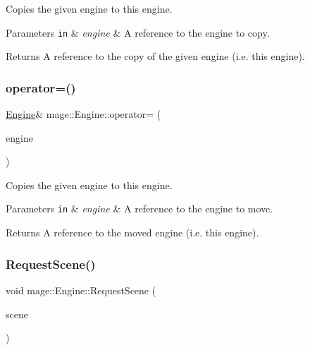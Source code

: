 Copies the given engine to this engine.


\begin{DoxyParams}[1]{Parameters}
\mbox{\tt in}  & {\em engine} & A reference to the engine to copy. \\
\hline
\end{DoxyParams}
\begin{DoxyReturn}{Returns}
A reference to the copy of the given engine (i.\+e. this engine). 
\end{DoxyReturn}
\hypertarget{classmage_1_1_engine_a22607a263e0be5e179cc0e4bf13b18f7}{}\label{classmage_1_1_engine_a22607a263e0be5e179cc0e4bf13b18f7} 
\subsubsection{\texorpdfstring{operator=()}{operator=()}\hspace{0.1cm}{\footnotesize\ttfamily [2/2]}}
{\footnotesize\ttfamily \hyperlink{classmage_1_1_engine}{Engine}\& mage\+::\+Engine\+::operator= (\begin{DoxyParamCaption}\item[{\hyperlink{classmage_1_1_engine}{Engine} \&\&}]{engine }\end{DoxyParamCaption})\hspace{0.3cm}{\ttfamily [delete]}}

Copies the given engine to this engine.


\begin{DoxyParams}[1]{Parameters}
\mbox{\tt in}  & {\em engine} & A reference to the engine to move. \\
\hline
\end{DoxyParams}
\begin{DoxyReturn}{Returns}
A reference to the moved engine (i.\+e. this engine). 
\end{DoxyReturn}
\hypertarget{classmage_1_1_engine_a0999f6eb6b09ad015103a46509b333b8}{}\label{classmage_1_1_engine_a0999f6eb6b09ad015103a46509b333b8} 
\subsubsection{\texorpdfstring{Request\+Scene()}{RequestScene()}}
{\footnotesize\ttfamily void mage\+::\+Engine\+::\+Request\+Scene (\begin{DoxyParamCaption}\item[{\hyperlink{namespacemage_a3316d7143a973e37adf1110f2e80ca31}{Unique\+Ptr}$<$ \hyperlink{classmage_1_1_scene}{Scene} $>$ \&\&}]{scene }\end{DoxyParamCaption})\hspace{0.3cm}{\ttfamily [noexcept]}}

